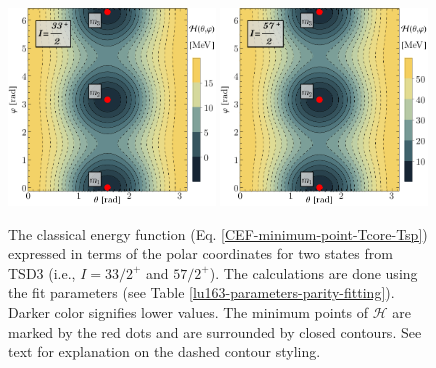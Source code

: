 \begin{figure}
    \centering
    \includegraphics[width=0.49\textwidth]{Chapters/Figures/parity-partners-plots/contour-tsd3-1.pdf}
    \includegraphics[width=0.49\textwidth]{Chapters/Figures/parity-partners-plots/contour-tsd3-2.pdf}
    \caption{The classical energy function (Eq. \ref{CEF-minimum-point-Tcore-Tsp}) expressed in terms of the polar coordinates for two states from TSD3 (i.e., $I=33/2^+$ and $57/2^+$). The calculations are done using the fit parameters (see Table \ref{lu163-parameters-parity-fitting}). Darker color signifies lower values. The minimum points of $\mathcal{H}$ are marked by the red dots and are surrounded by closed contours. See text for explanation on the dashed contour styling.}
    \label{contour-cef-polar-tsd3}
\end{figure}
